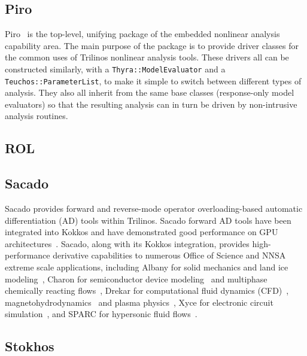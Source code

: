 \subsection{Piro}

Piro~\cite{osti_1231283} is the top-level, unifying package of the embedded nonlinear analysis capability area. 
The main purpose of the package is to provide driver classes for the common uses of Trilinos nonlinear analysis tools. 
These drivers all can be constructed similarly, with a \lstinline{Thyra::ModelEvaluator} and a \lstinline{Teuchos::ParameterList}, 
to make it simple to switch between different types of analysis. 
They also all inherit from the same base classes (response-only model evaluators) so that the resulting analysis can 
in turn be driven by non-intrusive analysis routines.


\subsection{ROL}

\subsection{Sacado}

Sacado \cite{SacadoURL,phipps2012efficient,phipps2008large} provides forward and reverse-mode operator overloading-based automatic differentiation (AD) tools within Trilinos.
Sacado forward AD tools have been integrated into Kokkos and have demonstrated good performance on GPU architectures~\cite{phipps2022automatic}.
Sacado, along with its Kokkos integration, provides high-performance derivative capabilities to numerous Office of Science and NNSA extreme scale applications, including Albany for solid mechanics and land ice modeling~\cite{Salinger2016,MPASAlbany2018}, 
Charon for semiconductor device modeling~\cite{CharonUsersManual2020} and multiphase chemically reacting flows~\cite{Musson2009}, Drekar for computational fluid dynamics (CFD)~\cite{Sondak2021,Shadid2016}, magnetohydrodynamics~\cite{Shadid2016mhd} and 
plasma physics~\cite{Crockatt2022,Miller2019}, Xyce for electronic circuit simulation~\cite{xyceTrilinos,xycePCE}, and SPARC for hypersonic fluid flows~\cite{SparcValidation}. 

\subsection{Stokhos}

